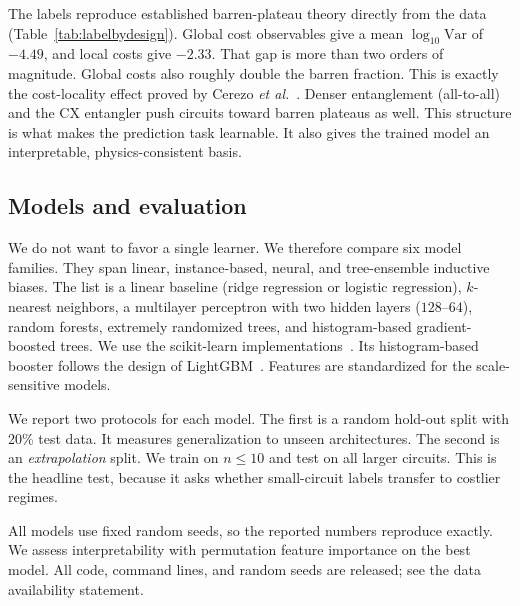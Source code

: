 \documentclass[aps,pra,preprint,amsmath,amssymb,floatfix,nofootinbib]{revtex4-2}
\newcommand{\ExtrapCut}{10}
\begin{document}
The labels reproduce established barren-plateau theory directly from the data
(Table~\ref{tab:labelbydesign}). Global cost observables give a mean
$\log_{10}\mathrm{Var}$ of $-4.49$, and local costs give $-2.33$. That gap is
more than two orders of magnitude. Global costs also roughly double the barren
fraction. This is exactly the cost-locality effect proved by Cerezo \textit{et
al.}~\cite{cerezo2021cost}. Denser entanglement (all-to-all) and the CX entangler
push circuits toward barren plateaus as well. This structure is what makes the
prediction task learnable. It also gives the trained model an interpretable,
physics-consistent basis.

\begin{table}[t]
\caption{Trainability broken down by design choice. Lower mean
$\log_{10}\mathrm{Var}$ and higher barren \% indicate less trainable families.
The data recovers known barren-plateau drivers.}
\label{tab:labelbydesign}
\centering

\end{table}

\subsection{Models and evaluation}
We do not want to favor a single learner. We therefore compare six model
families. They span linear, instance-based, neural, and tree-ensemble inductive
biases. The list is a linear baseline (ridge regression or logistic regression),
$k$-nearest neighbors, a multilayer perceptron with two hidden layers
($128$--$64$), random forests, extremely randomized trees, and histogram-based
gradient-boosted trees. We use the scikit-learn
implementations~\cite{pedregosa2011scikit}. Its histogram-based booster follows
the design of LightGBM~\cite{ke2017lightgbm}. Features are standardized for the
scale-sensitive models.

We report two protocols for each model. The first is a random hold-out split with
20\% test data. It measures generalization to unseen architectures. The second is
an \emph{extrapolation} split. We train on $n\le\ExtrapCut{}$ and test on all
larger circuits. This is the headline test, because it asks whether
small-circuit labels transfer to costlier regimes.

All models use fixed random seeds, so the reported numbers reproduce exactly. We
assess interpretability with permutation feature importance on the best model.
All code, command lines, and random seeds are released; see the data availability
statement.
\end{document}
